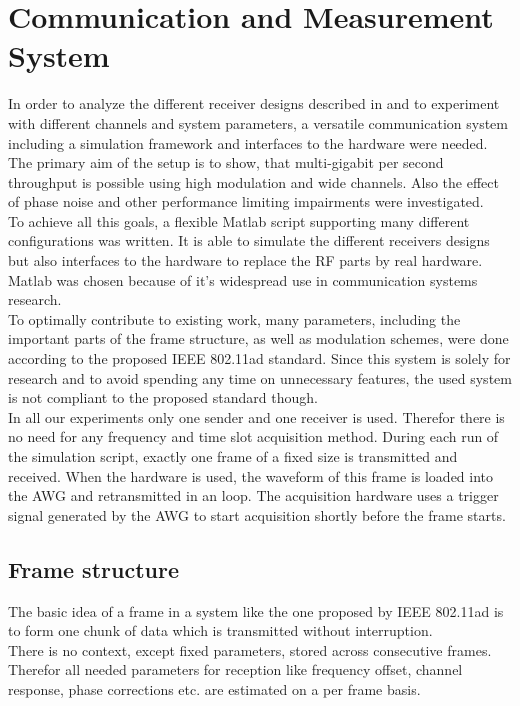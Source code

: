 \chapter{Communication and Measurement System}
\label{chap:sys}

In order to analyze the different receiver designs described in
 and to experiment with different channels
and system parameters, a versatile communication system
including a simulation framework and interfaces to the hardware
were needed. \\

The primary aim of the setup is to show, that multi-gigabit per second
throughput is possible using high modulation and wide channels.
Also the effect of phase noise and other performance limiting impairments
were investigated. \\

To achieve all this goals, a flexible Matlab script supporting
many different configurations was written. It is able to simulate
the different receivers designs but also interfaces to the hardware
to replace the \gls{RF} parts by real hardware. Matlab was chosen
because of it's widespread use in communication systems research. \\

To optimally contribute to existing work, many parameters, including
the important parts of the frame structure, as well as modulation
schemes, were done according to the proposed \gls{IEEE} 802.11ad standard.
Since this system is solely for research and to avoid spending any
time on unnecessary features, the used system is not compliant to the
proposed standard though. \\

In all our experiments only one sender and one receiver is used.
Therefor there is no need for any frequency and time slot acquisition
method. During each run of the simulation script, exactly one frame
of a fixed size is transmitted and received.
When the hardware is used, the waveform of this frame is loaded into
the \gls{AWG} and retransmitted in an loop.
The acquisition hardware uses a trigger signal generated by the \gls{AWG}
to start acquisition shortly before the frame starts.

\section{Frame structure}
\label{sec:sys_frame_struct}
The basic idea of a frame in a system like the one proposed by
IEEE 802.11ad is to form one chunk of data which is transmitted without
interruption. \\
There is no context, except fixed parameters, stored across consecutive
frames. Therefor all needed parameters for reception like frequency offset,
channel response, phase corrections etc. are estimated on a per frame basis. \\

